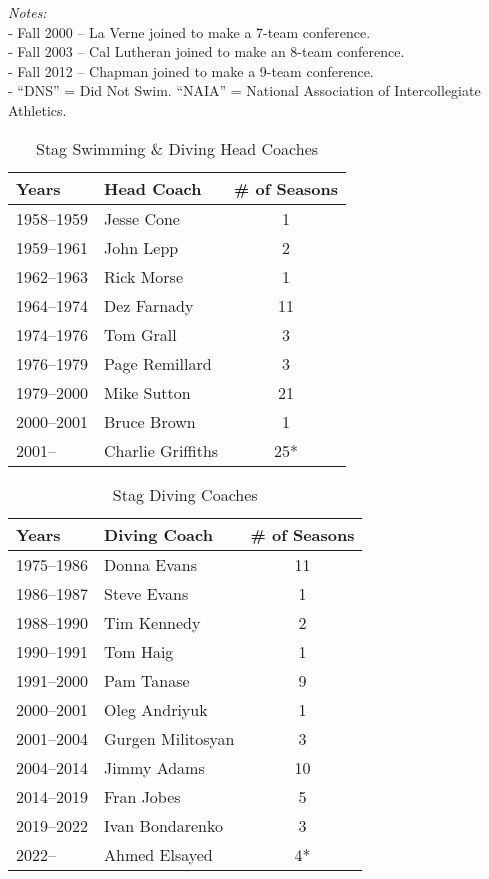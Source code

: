     \noindent\textit{Notes:} \\ 
       - Fall 2000 – La Verne joined to make a 7-team conference. \\
       - Fall 2003 – Cal Lutheran joined to make an 8-team conference. \\
       - Fall 2012 – Chapman joined to make a 9-team conference. \\
       - ``DNS'' = Did Not Swim. ``NAIA'' = National Association of Intercollegiate Athletics.

\clearpage

\begin{table}[htbp]
    \centering
    \caption*{Stag Swimming \& Diving Head Coaches}
    \begin{tabular}{llc}
    \toprule
    Years & Head Coach & \# of Seasons \\
    \midrule
    1958--1959 & Jesse Cone & 1 \\
    1959--1961 & John Lepp & 2 \\
    1962--1963 & Rick Morse & 1 \\
    1964--1974 & Dez Farnady & 11 \\
    1974--1976 & Tom Grall & 3 \\
    1976--1979 & Page Remillard & 3 \\
    1979--2000 & Mike Sutton & 21 \\
    2000--2001 & Bruce Brown & 1 \\
    2001-- & Charlie Griffiths & 25* \\
    \bottomrule
    \end{tabular}
    \end{table}
    
    
    \begin{table}[htbp]
    \centering
    \caption*{Stag Diving Coaches}
    \begin{tabular}{llc}
    \toprule
    Years & Diving Coach & \# of Seasons \\
    \midrule
    1975--1986 & Donna Evans & 11 \\
    1986--1987 & Steve Evans & 1 \\
    1988--1990 & Tim Kennedy & 2 \\
    1990--1991 & Tom Haig & 1 \\
    1991--2000 & Pam Tanase & 9 \\
    2000--2001 & Oleg Andriyuk & 1 \\
    2001--2004 & Gurgen Militosyan & 3 \\
    2004--2014 & Jimmy Adams & 10 \\
    2014--2019 & Fran Jobes & 5 \\
    2019--2022 & Ivan Bondarenko & 3 \\
    2022-- & Ahmed Elsayed & 4* \\
    \bottomrule
    \end{tabular}
    \end{table}

